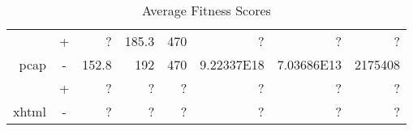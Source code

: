 \begin{table}[H]
\begin{tabular}{|r|c|r|r|r|r|r|r|}
                               & +                                                                           &              ?                                                              &                          185.3                                                &                                470                                           &                                         ?                                    &                                        ?                                        &                                 ?                                              \\ \cline{2-8} 
\multirow{-2}{*}{pcap}         & \cellcolor[HTML]{C0C0C0}-                                                   & \cellcolor[HTML]{C0C0C0} 152.8                                              & \cellcolor[HTML]{C0C0C0} 192                                                  & \cellcolor[HTML]{C0C0C0} 470                                                 & \cellcolor[HTML]{C0C0C0} 9.22337E18                                          & \cellcolor[HTML]{C0C0C0} 7.03686E13                                             & \cellcolor[HTML]{C0C0C0} 2175408                                               \\ \hline \hline
                               & +                                                                           &       ?                                                                     &                              ?                                                &                                 ?                                            &                                        ?                                     &                                         ?                                       &                                      ?                                         \\ \cline{2-8} 
\multirow{-2}{*}{xhtml}        & \cellcolor[HTML]{C0C0C0}-                                                   & \cellcolor[HTML]{C0C0C0}    ?                                               & \cellcolor[HTML]{C0C0C0} ?                                                    & \cellcolor[HTML]{C0C0C0}  ?                                                  & \cellcolor[HTML]{C0C0C0}    ?                                                & \cellcolor[HTML]{C0C0C0}  ?                                                     & \cellcolor[HTML]{C0C0C0}   ?                                                   \\ \hline
\end{tabular}
\caption{Average Fitness Scores}
\label{tbl:fitness}
\end{table}


